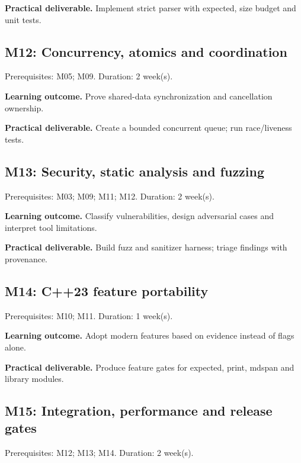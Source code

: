 \documentclass[11pt]{article}
\begin{document}
\textbf{Practical deliverable.} Implement strict parser with expected, size budget and unit tests.

\subsection{M12: Concurrency, atomics and coordination}
Prerequisites: M05; M09. Duration: 2 week(s).

\textbf{Learning outcome.} Prove shared-data synchronization and cancellation ownership.

\textbf{Practical deliverable.} Create a bounded concurrent queue; run race/liveness tests.

\subsection{M13: Security, static analysis and fuzzing}
Prerequisites: M03; M09; M11; M12. Duration: 2 week(s).

\textbf{Learning outcome.} Classify vulnerabilities, design adversarial cases and interpret tool limitations.

\textbf{Practical deliverable.} Build fuzz and sanitizer harness; triage findings with provenance.

\subsection{M14: C++23 feature portability}
Prerequisites: M10; M11. Duration: 1 week(s).

\textbf{Learning outcome.} Adopt modern features based on evidence instead of flags alone.

\textbf{Practical deliverable.} Produce feature gates for expected, print, mdspan and library modules.

\subsection{M15: Integration, performance and release gates}
Prerequisites: M12; M13; M14. Duration: 2 week(s).
\end{document}
